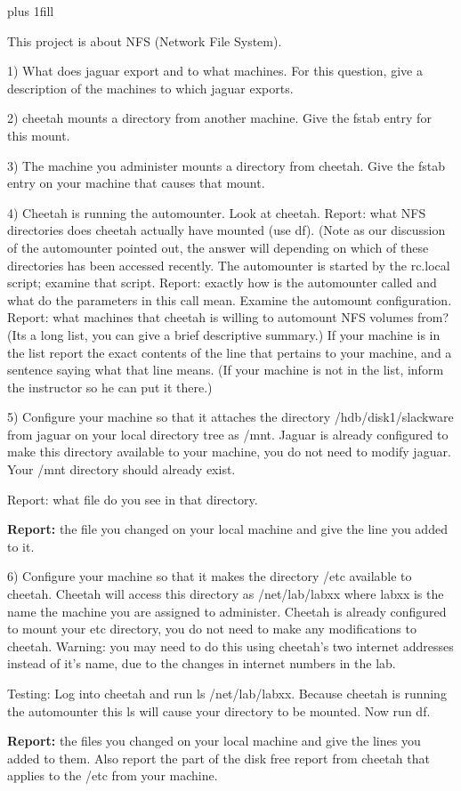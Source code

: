 
\rightskip=0pt plus 1fill

\parindent 0pt

This project is about NFS (Network File System).

1) What does jaguar export and to what machines.
For this question, give a description of the machines to which
jaguar exports.

2) cheetah mounts a directory from another machine.
Give the fstab entry for this mount.

3) The machine you administer mounts a directory from cheetah.
Give the fstab entry on your machine that causes that mount.

4) Cheetah is running the automounter.
Look at cheetah. 
Report: what NFS directories does cheetah actually have mounted 
(use {\ltt{}df}).
(Note as our discussion of the automounter pointed out, the answer will
depending on which of these directories has been accessed recently.
The automounter is started by the {\ltt{}rc.local} script;
examine that script.
Report: exactly how is the automounter called and
what do the parameters in this call mean.
Examine the automount configuration.
Report: what machines that cheetah is willing to automount NFS volumes from?
(Its a long list, you can give a brief descriptive summary.)
If your machine is in the list report the exact contents of the
line that pertains to your machine, and a sentence saying what that
line means.
(If your machine is not in the list, inform the instructor so he can put it
there.)

5) Configure your machine so that it attaches the directory
{\ltt{}/hdb/disk1/slackware} from jaguar on your local directory tree
as {\ltt{}/mnt}.
Jaguar is already configured to make this directory available to your
machine, you do not need to modify jaguar.
Your {\ltt{}/mnt} directory should already exist.

Report: what file do you see in that directory.

{\bf Report:} the file you changed on your local machine and give the line
you added to it.

6) Configure your machine so that it makes the directory
{\ltt{}/etc} available to cheetah.
Cheetah will access this directory as {\ltt{}/net/lab/labxx} where {\ltt{}labxx}
is the name the machine you are assigned to administer.
Cheetah is already configured to mount your {\ltt{}etc} directory,
you do not need to make any modifications to cheetah.
Warning: you may need to do this using cheetah's two internet addresses
instead of it's name, due to the changes in internet numbers in the lab.

Testing: Log into cheetah and run {\ltt{}ls /net/lab/labxx}.
Because cheetah is running the automounter
this {\ltt{}ls} will cause your directory to be mounted.
Now run {\ltt{}df}.

{\bf Report:} the files you changed on your local machine and give the lines 
you added to them.
Also report the part of the disk free report from cheetah that applies to 
the {\ltt{}/etc} from your machine.

\bye
